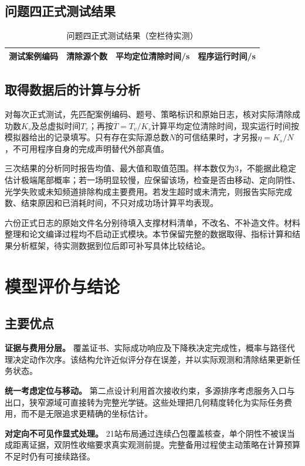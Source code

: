 \documentclass[UTF8,a4paper,12pt,fontset=fandol]{ctexart}
\newcommand{\nextpage}{\clearpage}
\begin{document}
\subsection{问题四正式测试结果}
\begin{table}[H]\centering\caption{问题四正式测试结果（空栏待实测）}\small
\begin{tabularx}{\linewidth}{Yccc}\toprule
测试案例编码 & 清除源个数 & 平均定位清除时间/s & 程序运行时间/s\\\midrule

\end{tabularx}\end{table}

\subsection{取得数据后的计算与分析}
对每次正式测试，先匹配案例编码、题号、策略标识和原始日志，核对实际清除成功数$K_s$及总虚拟时间$T_v$；再按$\overline T=T_v/K_s$计算平均定位清除时间，现实运行时间按模拟器给出的记录填写。只有存在实际源总数$N$的可信结果时，才另报$\eta=K_s/N$，不可用程序自身的完成声明替代外部真值。

三次结果的分析同时报告均值、最大值和取值范围。样本数仅为3，不能据此稳定估计极端尾部概率；若一场明显较慢，应保留该场，检查是否由移动、定向阴性、光学失败或未知频道排除构成主要费用。若发生超时或未清完，则报告实际完成数、结束原因和已消耗时间，不只对成功场计算平均表现。

六份正式日志的原始文件名分别待填入支撑材料清单，不改名、不补造文件。材料整理和论文编译过程均不启动正式模块。本节保留完整的数据取得、指标计算和结果分析框架，待实测数据到位后即可补写具体比较结论。

\nextpage
\section{模型评价与结论}
\subsection{主要优点}
\textbf{证据与费用分层。} 覆盖证书、实际成功响应及下降秩决定完成性，概率与路径代理决定动作次序。该结构允许近似评分存在误差，并以实际观测和清除结果更新任务状态。

\textbf{统一考虑定位与移动。} 第二点设计利用首次接收约束，多源排序考虑服务入口与出口，狭窄源域可直接转为完整光学链。这些处理把几何精度转化为实际任务费用，而不是无限追求更精确的坐标估计。

\textbf{对定向不可见作显式处理。} 21站布局通过连续凸包覆盖核查，单个阴性不被误当成距离证据，双阴性收缩要求真实观测前提。完整备用过程使主动策略在计算预算不足时仍有可接续路径。
\end{document}
